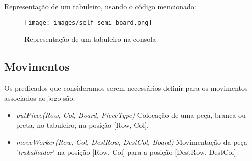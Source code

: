\documentclass[a4paper]{article}
\begin{document}
Representação de um tabuleiro, usando o código mencionado:\newline

\begin{figure}[h!]
\begin{center}
	\texttt{[image: images/self\_semi\_board.png]}
	\caption{Representação de um tabuleiro na consola}
	\label{Figura 9}
\end{center}
\end{figure}

\newpage

\subsection{Movimentos}
Os predicados que consideramos serem necessários definir para os movimentos associados ao jogo são:

\begin{itemize}
	\item \textit{putPiece(Row, Col, Board, PieceType)}\newline
	Colocação de uma peça, branca ou preta, no tabuleiro, na posição [Row, Col].
	
	\item \textit{moveWorker(Row, Col, DestRow, DestCol, Board)}\newline
	Movimentação da peça '\textit{trabalhador}' na posição [Row, Col] para a posição [DestRow, DestCol]
\end{itemize}
	
\end{document}
